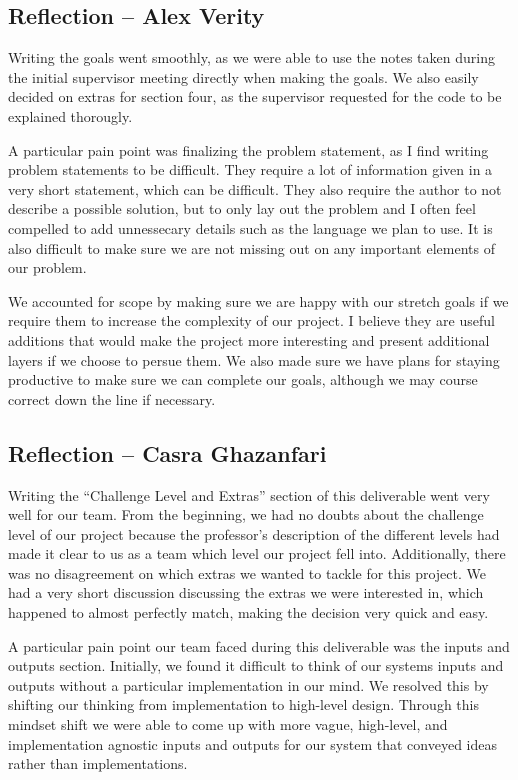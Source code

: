 \documentclass{article}
\begin{document}
\subsection{Reflection -- Alex Verity}

Writing the goals went smoothly, as we were able to use the notes taken during
the initial supervisor meeting directly when making the goals. We also easily
decided on extras for section four, as the supervisor requested for the code
to be explained thorougly.\newline

A particular pain point was finalizing the problem statement, as I find
writing problem statements to be difficult. They require a lot of information
given in a very short statement, which can be difficult. They also require
the author to not describe a possible solution, but to only lay out the
problem and I often feel compelled to add unnessecary details such as the
language we plan to use. It is also difficult to make sure we are not missing
out on any important elements of our problem.\newline

We accounted for scope by making sure we are happy with our stretch goals if
we require them to increase the complexity of our project. I believe they are
useful additions that would make the project more interesting and present
additional layers if we choose to persue them. We also made sure we have plans
for staying productive to make sure we can complete our goals, although we may
course correct down the line if necessary.

\subsection*{Reflection -- Casra Ghazanfari}

Writing the “Challenge Level and Extras” section of this deliverable went
very well for our team. From the beginning, we had no doubts about the challenge
level of our project because the professor’s description of the different levels
had made it clear to us as a team which level our project fell into.
Additionally, there was no disagreement on which extras we wanted to tackle for
this project. We had a very short discussion discussing the extras we were
interested in, which happened to almost perfectly match, making the decision
very quick and easy. \newline

A particular pain point our team faced during this deliverable was the inputs
and outputs section. Initially, we found it difficult to think of our systems
inputs and outputs without a particular implementation in our mind. We resolved
this by shifting our thinking from implementation to high-level design. Through
this mindset shift we were able to come up with more vague, high-level, and
implementation agnostic inputs and outputs for our system that conveyed ideas
rather than implementations. \newline
\end{document}
